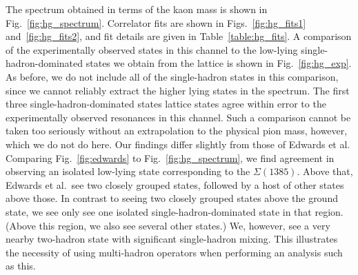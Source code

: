 The spectrum obtained in terms of the kaon mass is shown in Fig.~\ref{fig:hg_spectrum}. Correlator fits are shown in Figs.~\ref{fig:hg_fits1} and~\ref{fig:hg_fits2}, and fit details are given in Table~\ref{table:hg_fits}. A comparison of the experimentally observed states in this channel to the low-lying single-hadron-dominated states we obtain from the lattice is shown in Fig.~\ref{fig:hg_exp}. As before, we do not include all of the single-hadron states in this comparison, since we cannot reliably extract the higher lying states in the spectrum. The first three single-hadron-dominated states lattice states agree within error to the experimentally observed resonances in this channel. Such a comparison cannot be taken too seriously without an extrapolation to the physical pion mass, however, which we do not do here. Our findings differ slightly from those of Edwards et al. Comparing Fig.~\ref{fig:edwards} to Fig.~\ref{fig:hg_spectrum}, we find agreement in observing an isolated low-lying state corresponding to the $\Sigma(1385)$. Above that, Edwards et al.\ see two closely grouped states, followed by a host of other states above those. In contrast to seeing two closely grouped states above the ground state, we see only see one isolated single-hadron-dominated state in that region. (Above this region, we also see several other states.) We, however, see a very nearby two-hadron state with significant single-hadron mixing. This illustrates the necessity of using multi-hadron operators when performing an analysis such as this.
